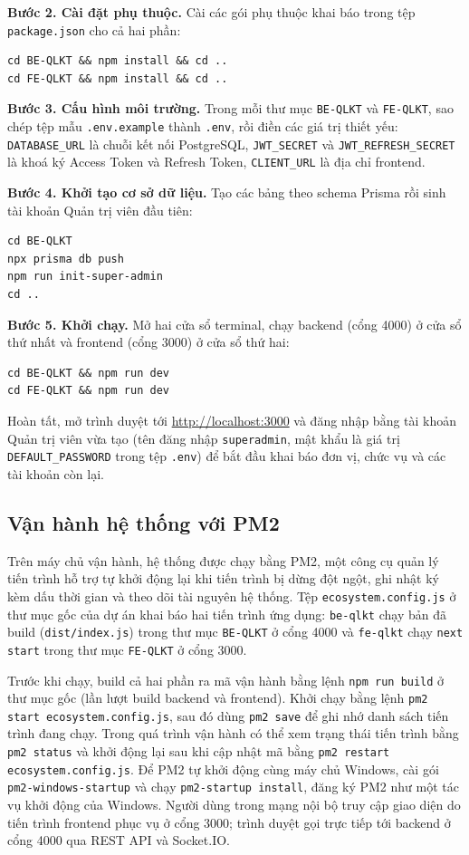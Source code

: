 \documentclass[../DoAn.tex]{subfiles}
\begin{document}
\textbf{Bước 2. Cài đặt phụ thuộc.} Cài các gói phụ thuộc khai báo trong tệp \texttt{package.json} cho cả hai phần:
\begin{lstlisting}[style=shell]
cd BE-QLKT && npm install && cd ..
cd FE-QLKT && npm install && cd ..
\end{lstlisting}

\textbf{Bước 3. Cấu hình môi trường.} Trong mỗi thư mục \texttt{BE-QLKT} và \texttt{FE-QLKT}, sao chép tệp mẫu \texttt{.env.example} thành \texttt{.env}, rồi điền các giá trị thiết yếu: \texttt{DATABASE\_URL} là chuỗi kết nối PostgreSQL, \texttt{JWT\_SECRET} và \texttt{JWT\_REFRESH\_SECRET} là khoá ký Access Token và Refresh Token, \texttt{CLIENT\_URL} là địa chỉ frontend.

\textbf{Bước 4. Khởi tạo cơ sở dữ liệu.} Tạo các bảng theo schema Prisma rồi sinh tài khoản Quản trị viên đầu tiên:
\begin{lstlisting}[style=shell]
cd BE-QLKT
npx prisma db push
npm run init-super-admin
cd ..
\end{lstlisting}

\textbf{Bước 5. Khởi chạy.} Mở hai cửa sổ terminal, chạy backend (cổng 4000) ở cửa sổ thứ nhất và frontend (cổng 3000) ở cửa sổ thứ hai:
\begin{lstlisting}[style=shell]
cd BE-QLKT && npm run dev
cd FE-QLKT && npm run dev
\end{lstlisting}

Hoàn tất, mở trình duyệt tới \url{http://localhost:3000} và đăng nhập bằng tài khoản Quản trị viên vừa tạo (tên đăng nhập \texttt{superadmin}, mật khẩu là giá trị \texttt{DEFAULT\_PASSWORD} trong tệp \texttt{.env}) để bắt đầu khai báo đơn vị, chức vụ và các tài khoản còn lại.

\subsection{Vận hành hệ thống với PM2}
\label{subsection:4.5.3}

Trên máy chủ vận hành, hệ thống được chạy bằng PM2, một công cụ quản lý tiến trình hỗ trợ tự khởi động lại khi tiến trình bị dừng đột ngột, ghi nhật ký kèm dấu thời gian và theo dõi tài nguyên hệ thống.
Tệp \texttt{ecosystem.config.js} ở thư mục gốc của dự án khai báo hai tiến trình ứng dụng: \texttt{be-qlkt} chạy bản đã build (\texttt{dist/index.js}) trong thư mục \texttt{BE-QLKT} ở cổng 4000 và \texttt{fe-qlkt} chạy \texttt{next start} trong thư mục \texttt{FE-QLKT} ở cổng 3000.

Trước khi chạy, build cả hai phần ra mã vận hành bằng lệnh \texttt{npm run build} ở thư mục gốc (lần lượt build backend và frontend).
Khởi chạy bằng lệnh \texttt{pm2 start ecosystem.config.js}, sau đó dùng \texttt{pm2 save} để ghi nhớ danh sách tiến trình đang chạy.
Trong quá trình vận hành có thể xem trạng thái tiến trình bằng \texttt{pm2 status} và khởi động lại sau khi cập nhật mã bằng \texttt{pm2 restart ecosystem.config.js}.
Để PM2 tự khởi động cùng máy chủ Windows, cài gói \texttt{pm2-windows-startup} và chạy \texttt{pm2-startup install}, đăng ký PM2 như một tác vụ khởi động của Windows.
Người dùng trong mạng nội bộ truy cập giao diện do tiến trình frontend phục vụ ở cổng 3000; trình duyệt gọi trực tiếp tới backend ở cổng 4000 qua REST API và Socket.IO.
\end{document}

